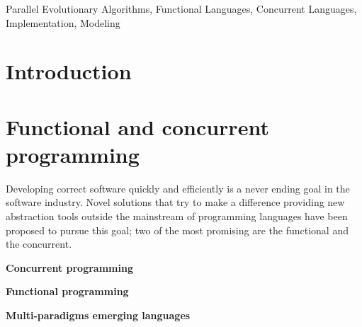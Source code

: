 \documentclass[9pt, technote]{IEEEtran}
\newcommand{\simpleEntry}[1]
{
\vspace{.3cm}
\noindent \textbf{#1}
\vspace{.3cm}
}
\begin{document}

\begin{IEEEkeywords}
Parallel Evolutionary Algorithms, Functional Languages, Concurrent Languages, Implementation, Modeling
\end{IEEEkeywords}


\section{Introduction}
\label{sec:intro}
    

\section{Functional and concurrent programming}
\label{sec:stateArt}
Developing correct software quickly and efficiently is a never ending goal in the software industry. Novel solutions that try to make a difference providing new abstraction tools outside the mainstream of programming languages have been proposed to pursue this goal; two of the most promising are the functional and the concurrent.





\simpleEntry{Concurrent programming}
    

\simpleEntry{Functional programming}
    

\simpleEntry{Multi-paradigms emerging languages} %
    
\end{document}
